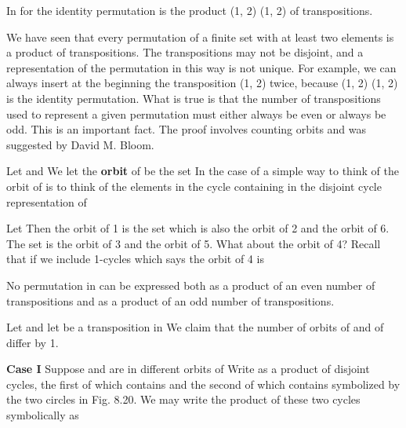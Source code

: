 \documentclass[11pt,oneside]{article}
\begin{document}
\begin{BookBody}

 In  for  the identity permutation is the product (1, 2) (1, 2) of transpositions. \BookEnd{\blacktriangle}

\noindent We have seen that every permutation of a finite set with at least two elements is a product of transpositions. The transpositions may not be disjoint, and a representation of the permutation in this way is not unique. For example, we can always insert at the beginning the transposition (1, 2) twice, because (1, 2) (1, 2) is the identity permutation. What is true is that the number of transpositions used to represent a given permutation must either always be even or always be odd. This is an important fact. The proof involves counting orbits and was suggested by David M. Bloom.

\noindent Let  and  We let the\textbf{ orbit} of  be the set  In the case of  a simple way to think of the orbit of  is to think of the elements in the cycle containing  in the disjoint cycle representation of 

 Let  Then the orbit of 1 is the set  which is also the orbit of 2 and the orbit of 6. The set  is the orbit of 3 and the orbit of 5. What about the orbit of 4? Recall that if we include 1-cycles which says the orbit of 4 is \BookEnd{\blacktriangle}

 No permutation in  can be expressed both as a product of an even number of transpositions and as a product of an odd number of transpositions.

 Let  and let  be a transposition in  We claim that the number of orbits of \BookInline{\sigma } and of \BookInline{\tau \sigma } differ by 1.

\noindent \textbf{Case I} Suppose  and  are in different orbits of  Write \BookInline{\sigma } as a product of disjoint cycles, the first of which contains  and the second of which contains  symbolized by the two circles in Fig. 8.20. We may write the product of these two cycles symbolically as


\end{BookBody}
\end{document}
